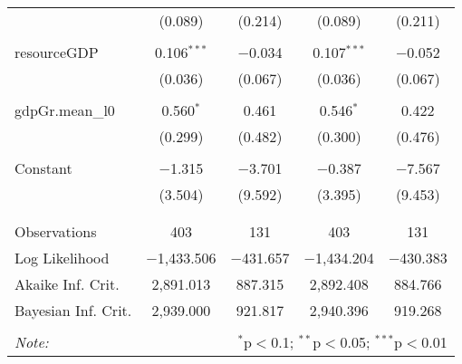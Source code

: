 \begin{table}[!htbp]
\begin{tabular}{@{\extracolsep{5pt}}lcccc}
  & (0.089) & (0.214) & (0.089) & (0.211) \\ 
  & & & & \\ 
 resourceGDP & 0.106$^{***}$ & $-$0.034 & 0.107$^{***}$ & $-$0.052 \\ 
  & (0.036) & (0.067) & (0.036) & (0.067) \\ 
  & & & & \\ 
 gdpGr.mean\_l0 & 0.560$^{*}$ & 0.461 & 0.546$^{*}$ & 0.422 \\ 
  & (0.299) & (0.482) & (0.300) & (0.476) \\ 
  & & & & \\ 
 Constant & $-$1.315 & $-$3.701 & $-$0.387 & $-$7.567 \\ 
  & (3.504) & (9.592) & (3.395) & (9.453) \\ 
  & & & & \\ 
\hline \\[-1.8ex] 
Observations & 403 & 131 & 403 & 131 \\ 
Log Likelihood & $-$1,433.506 & $-$431.657 & $-$1,434.204 & $-$430.383 \\ 
Akaike Inf. Crit. & 2,891.013 & 887.315 & 2,892.408 & 884.766 \\ 
Bayesian Inf. Crit. & 2,939.000 & 921.817 & 2,940.396 & 919.268 \\ 
\hline 
\hline \\[-1.8ex] 
\textit{Note:}  & \multicolumn{4}{r}{$^{*}$p$<$0.1; $^{**}$p$<$0.05; $^{***}$p$<$0.01} \\ 
\end{tabular} 
\end{table}  

